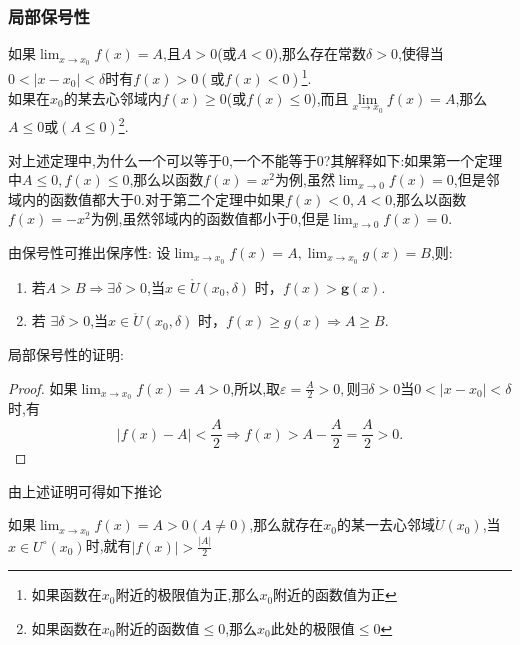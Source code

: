 \documentclass[12pt, a4paper, oneside, UTF8]{ctexbook}
\begin{document}
\begin{sloppypar}
    \subsubsection{局部保号性}
    \begin{them}{}{}
        如果$\lim_{x\to x_0}f(x)=A$,且$A>0$(或$A<0$),那么存在常数$\delta>0$,使得当$0<|x-x_0|<\delta$时有$f(x)>0(或f(x)<0)$\footnote{如果函数在$x_0$附近的极限值为正,那么$x_0$附近的函数值为正}.
        \\
        如果在$x_0$的某去心邻域内$f(x)\geqslant 0$(或$f(x)\leqslant 0$),而且$\underset{x\to x_0}{\operatorname*{lim}}f(x)=A$,那么$A \leqslant 0$或$(A \leq 0)$\footnote{如果函数在$x_0$附近的函数值$\leq 0$,那么$x_0$此处的极限值$\le 0$}.
    \end{them}
    对上述定理中,为什么一个可以等于0,一个不能等于0?其解释如下:如果第一个定理中$A \leqslant 0,f(x)\leqslant 0$,那么以函数$f(x)={x^2}$为例,虽然$\lim_{x \to 0}f(x)=0 $,但是邻域内的函数值都大于0.对于第二个定理中如果$f(x) < 0,A< 0$,那么以函数$f(x)={-x^2}$为例,虽然邻域内的函数值都小于0,但是$\lim_{x \to 0}f(x)=0 $.
    \begin{criterion}{}{}
        由保号性可推出保序性:
        设$\lim_{x\to x_0}f(x)=A,\lim_{x\to x_{0}}g(x)=B$,则:
        \begin{enumerate}
            \item 若$A>B\Rightarrow\exists\delta>0$,当${x}\in\mathring{U}(x_0,\delta)$ 时，$f(x)>\mathbf{g}(x).$ 
            \item 若 $\exists\delta>0$,当$x\in\mathring{U}(x_0,\delta)$ 时，$f(x)\geqslant g(x)\Rightarrow A\geqslant B.$
        \end{enumerate}
    \end{criterion}
    \begin{problem}
        局部保号性的证明:
    \end{problem}
        \begin{proof}
            如果$\lim_{x\to x_{0}}f(x)=A > 0$,所以,取$\varepsilon=\frac{A}{2}>0,则\exists \delta >0 $当$0<|x-x_0|<\delta$时,有
            $$
                |f(x)-A|<\frac{A}{2}\Rightarrow f(x)>A-\frac{A}{2}=\frac{A}{2}>0.
            $$
        \end{proof}
    由上述证明可得如下推论
    \begin{corollary}{}{}
        如果$\lim_{x\to x_{0}}f(x)=A > 0(A \neq 0)$,那么就存在$x_0$的某一去心邻域$\mathring{U}\left(x_{0}\right)$,当$x\in U^{\circ}(x_{0})$时,就有$|f(x)|>\frac{|A|}{2}$
    \end{corollary}

\end{sloppypar}
\end{document}
